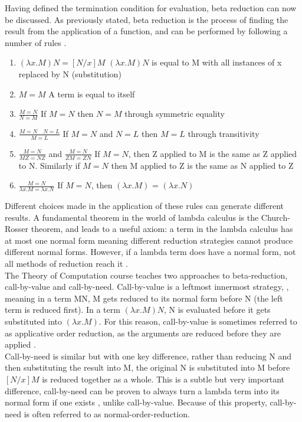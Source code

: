 \documentclass[a4paper,12pt]{report}
\begin{document}
Having defined the termination condition for evaluation, beta reduction can now be discussed. As previously stated, beta reduction is the process of finding the result from the application of a function, and can be performed by following a number of rules \cite{Gay2019}.

\begin{enumerate}
	\item $(\lambda x.M)N = [N / x]M$
	\subitem $(\lambda x.M)N$ is equal to M with all instances of x replaced by N (substitution)
	\item $M = M$
	\subitem A term is equal to itself
	\item $\frac{M=N}{N=M}$
	\subitem If $M=N$ then $N=M$ through symmetric equality
	\item $\frac{M=N \quad N=L}{M=L}$
	\subitem If $M=N$ and $N=L$ then $M=L$ through transitivity
	\item $\frac{M=N}{MZ=NZ}$ and $\frac{M=N}{ZM=ZN}$
	\subitem If $M=N$, then Z applied to M is the same as Z applied to N. Similarly if $M=N$ then M applied to Z is the same as N applied to Z
	\item $\frac{M=N}{\lambda x.M = \lambda x.N}$
	\subitem If $M=N$, then $(\lambda x.M)$ = $(\lambda x.N)$
\end{enumerate}

Different choices made in the application of these rules can generate different results. A fundamental theorem in the world of lambda calculus is the Church-Rosser theorem, and leads to a useful axiom: a term in the lambda calculus has at most one normal form \cite{Alonzo1936} meaning different reduction strategies cannot produce different normal forms. However, if a lambda term does have a normal form, not all methods of reduction reach it \cite{Horowitz2013}.\\

The Theory of Computation course teaches two approaches to beta-reduction, call-by-value and call-by-need. Call-by-value is a leftmost innermost strategy, \cite{Gay2019}, meaning in a term MN, M gets reduced to its normal form before N (the left term is reduced first). In a term $(\lambda x.M)N$, N is evaluated before it gets substituted into $(\lambda x.M)$. For this reason, call-by-value is sometimes referred to as applicative order reduction, as the arguments are reduced before they are applied \cite{Sookocheff2018Evaluation}.\\

Call-by-need is similar but with one key difference, rather than reducing N and then substituting the result into M, the original N is substituted into M before $[N / x]M$ is reduced together as a whole. This is a subtle but very important difference, call-by-need can be proven to always turn a lambda term into its normal form if one exists \cite{Horowitz2013}, unlike call-by-value. Because of this property, call-by-need is often referred to as normal-order-reduction.
\end{document}
